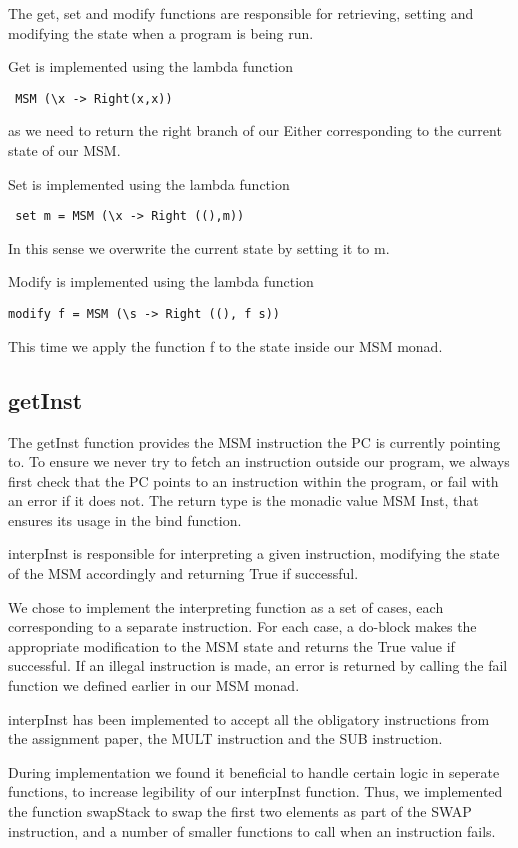\documentclass[]{article}
\begin{document}
The get, set and modify functions are responsible for retrieving, setting and modifying the state when a program is being run.\par

Get is implemented using the lambda function\begin{verbatim} MSM (\x -> Right(x,x)) \end{verbatim}as we need to return the right branch of our Either corresponding to the current state of our MSM.\par
Set is implemented using the lambda function\begin{verbatim} set m = MSM (\x -> Right ((),m))\end{verbatim} 
In this sense we overwrite the current state by setting it to m.\par
Modify is implemented using the lambda function \begin{verbatim}modify f = MSM (\s -> Right ((), f s))\end{verbatim} 
This time we apply the function f to the state inside our MSM monad. \par

\subsection{getInst}

The getInst function provides the MSM instruction the PC is currently pointing to. To ensure we never try to fetch an instruction outside our program, we always first check that the PC points to an instruction within the program, or fail with an error if it does not. The return type is the monadic value MSM Inst, that ensures its usage in the bind function.\par
interpInst is responsible for interpreting a given instruction, modifying the state of the MSM accordingly and returning True if successful.\par

We chose to implement the interpreting function as a set of cases, each corresponding to a separate instruction. For each case, a do-block makes the appropriate modification to the MSM state and returns the True value if successful. If an illegal instruction is made, an error is returned by calling the fail function we defined earlier in our MSM monad.\par
interpInst has been implemented to accept all the obligatory instructions from the assignment paper, the MULT instruction and the SUB instruction.\par
During implementation we found it beneficial to handle certain logic in seperate functions, to increase legibility of our interpInst function. Thus, we implemented the function swapStack to swap the first two elements as part of the SWAP instruction, and a number of smaller functions to call when an instruction fails.\par
\end{document}

